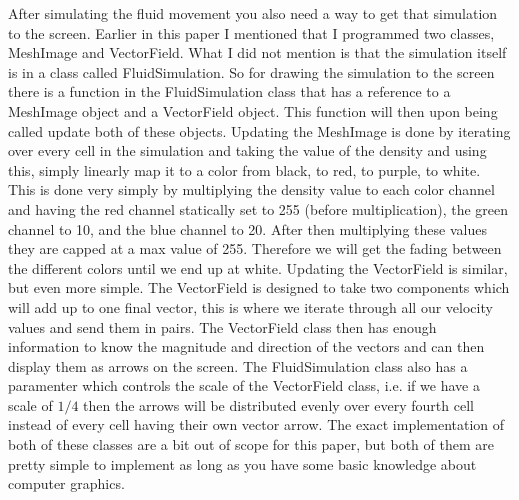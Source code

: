 \documentclass{article}
\begin{document}
\begin{multicols}{2}
After simulating the fluid movement you also need a way to get that simulation to the screen. Earlier in this paper I mentioned that I programmed two classes, MeshImage and VectorField. What I did not mention is that the simulation itself is in a class called FluidSimulation. So for drawing the simulation to the screen there is a function in the FluidSimulation class that has a reference to a MeshImage object and a VectorField object. This function will then upon being called update both of these objects. Updating the MeshImage is done by iterating over every cell in the simulation and taking the value of the density and using this, simply linearly map it to a color from black, to red, to purple, to white. This is done very simply by multiplying the density value to each color channel and having the red channel statically set to 255 (before multiplication), the green channel to 10, and the blue channel to 20. After then multiplying these values they are capped at a max value of 255. Therefore we will get the fading between the different colors until we end up at white. Updating the VectorField is similar, but even more simple. The VectorField is designed to take two components which will add up to one final vector, this is where we iterate through all our velocity values and send them in pairs. The VectorField class then has enough information to know the magnitude and direction of the vectors and can then display them as arrows on the screen. The FluidSimulation class also has a paramenter which controls the scale of the VectorField class, i.e. if we have a scale of $1/4$ then the arrows will be distributed evenly over every fourth cell instead of every cell having their own vector arrow. The exact implementation of both of these classes are a bit out of scope for this paper, but both of them are pretty simple to implement as long as you have some basic knowledge about computer graphics.


\end{multicols}
\end{document}

